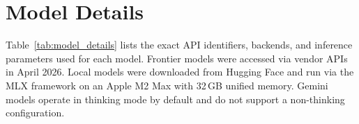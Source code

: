 \documentclass[11pt]{article}
\begin{document}


\clearpage
\onecolumn
\appendix

\section{Model Details}
\label{app:models}

Table~\ref{tab:model_details} lists the exact API identifiers, backends,
and inference parameters used for each model.
Frontier models were accessed via vendor APIs in April 2026.
Local models were downloaded from Hugging Face and run via the MLX
framework \cite{hannun2023mlx} on an Apple M2 Max with 32\,GB unified memory.
Gemini models operate in thinking mode by default and do not support
a non-thinking configuration.
\end{document}
